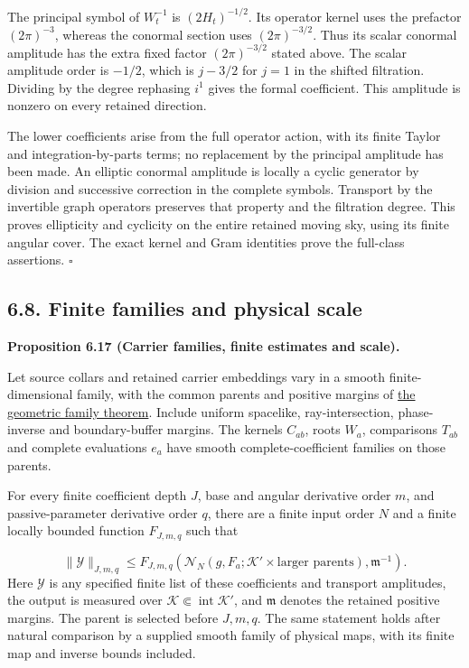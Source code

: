 \documentclass[
  english,
  11pt,
  reqno]{amsart}
\makeatletter
\newcommand{\pandocstatementheading}[1]{%
  \par\addpenalty{\@beginparpenalty}%
  \addvspace{.5\baselineskip plus .2\baselineskip minus .2\baselineskip}%
  {\normalfont\bfseries #1\par}%
  \nobreak\@afterindenttrue\@afterheading
}
\makeatother
\begin{document}
The principal symbol of \(W_t^{-1}\) is \((2H_t)^{-1/2}\). Its operator
kernel uses the prefactor \((2\pi)^{-3}\), whereas the conormal section
uses \((2\pi)^{-3/2}\). Thus its scalar conormal amplitude has the extra
fixed factor \((2\pi)^{-3/2}\) stated above. The scalar amplitude order
is \(-1/2\), which is \(j-3/2\) for \(j=1\) in the shifted filtration.
Dividing by the degree rephasing \(i^1\) gives the formal coefficient.
This amplitude is nonzero on every retained direction.

The lower coefficients arise from the full operator action, with its
finite Taylor and integration-by-parts terms; no replacement by the
principal amplitude has been made. An elliptic conormal amplitude is
locally a cyclic generator by division and successive correction in the
complete symbols. Transport by the invertible graph operators preserves
that property and the filtration degree. This proves ellipticity and
cyclicity on the entire retained moving sky, using its finite angular
cover. The exact kernel and Gram identities prove the full-class
assertions. \hfill\(\square\)

\subsection{6.8. Finite families and physical
scale}\label{finite-families-and-physical-scale}\label{sec:online-wave-carrier-estimates-scale}

\pandocstatementheading{\leavevmode{}\label{prop:online-wave-carrier-families-scale}Proposition 6.17 (Carrier families, finite estimates and scale).}

Let source collars and retained carrier embeddings vary in a smooth
finite-dimensional family, with the common parents and positive margins
of \hyperref[thm:online-common-collar-finite-families]{the geometric
family theorem}. Include uniform spacelike, ray-intersection,
phase-inverse and boundary-buffer margins. The kernels \(C_{ab}\), roots
\(W_a\), comparisons \(T_{ab}\) and complete evaluations \(e_a\) have
smooth complete-coefficient families on those parents.

For every finite coefficient depth \(J\), base and angular derivative
order \(m\), and passive-parameter derivative order \(q\), there are a
finite input order \(N\) and a finite locally bounded function
\(F_{J,m,q}\) such that

\label{eq:online-wave-carrier-finite-family-bound} \[
\|\mathcal Y\|_{J,m,q}
\le
F_{J,m,q}\left(
\mathcal N_N(g,F_a;\mathcal K'\times\text{larger parents}),
\mathfrak m^{-1}\right).
\] Here \(\mathcal Y\) is any specified finite list of these
coefficients and transport amplitudes, the output is measured over
\(\mathcal K\Subset\operatorname{int}\mathcal K'\), and \(\mathfrak m\)
denotes the retained positive margins. The parent is selected before
\(J,m,q\). The same statement holds after natural comparison by a
supplied smooth family of physical maps, with its finite map and inverse
bounds included.
\end{document}
